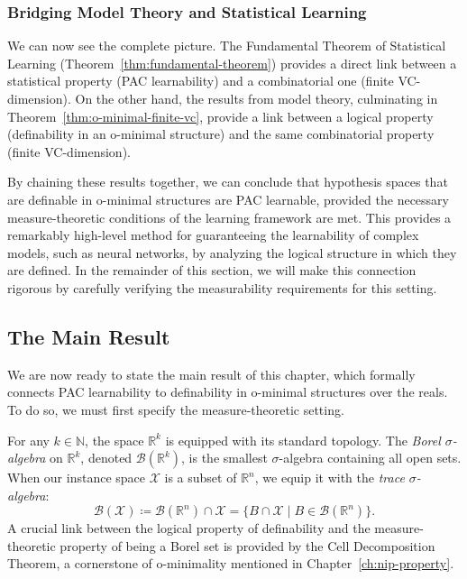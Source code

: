 \subsubsection{Bridging Model Theory and Statistical Learning}

We can now see the complete picture. The Fundamental Theorem of Statistical Learning (Theorem~\ref{thm:fundamental-theorem}) provides a direct link between a statistical property (PAC learnability) and a combinatorial one (finite VC-dimension). On the other hand, the results from model theory, culminating in Theorem~\ref{thm:o-minimal-finite-vc}, provide a link between a logical property (definability in an o-minimal structure) and the same combinatorial property (finite VC-dimension).

By chaining these results together, we can conclude that hypothesis spaces that are definable in o-minimal structures are PAC learnable, provided the necessary measure-theoretic conditions of the learning framework are met. This provides a remarkably high-level method for guaranteeing the learnability of complex models, such as neural networks, by analyzing the logical structure in which they are defined. In the remainder of this section, we will make this connection rigorous by carefully verifying the measurability requirements for this setting.

\subsection{The Main Result}

We are now ready to state the main result of this chapter, which formally connects PAC learnability to definability in o-minimal structures over the reals. To do so, we must first specify the measure-theoretic setting.

For any $k \in \mathbb{N}$, the space $\mathbb{R}^k$ is equipped with its standard topology. The \emph{Borel $\sigma$-algebra} on $\mathbb{R}^k$, denoted $\mathcal{B}(\mathbb{R}^k)$, is the smallest $\sigma$-algebra containing all open sets. When our instance space $\mathcal{X}$ is a subset of $\mathbb{R}^n$, we equip it with the \emph{trace $\sigma$-algebra}:
\[
    \mathcal{B}(\mathcal{X}) \coloneqq \mathcal{B}(\mathbb{R}^n) \cap \mathcal{X} = \{ B \cap \mathcal{X} \mid B \in \mathcal{B}(\mathbb{R}^n) \}.
\]
A crucial link between the logical property of definability and the measure-theoretic property of being a Borel set is provided by the Cell Decomposition Theorem, a cornerstone of o-minimality mentioned in Chapter~\ref{ch:nip-property}.

